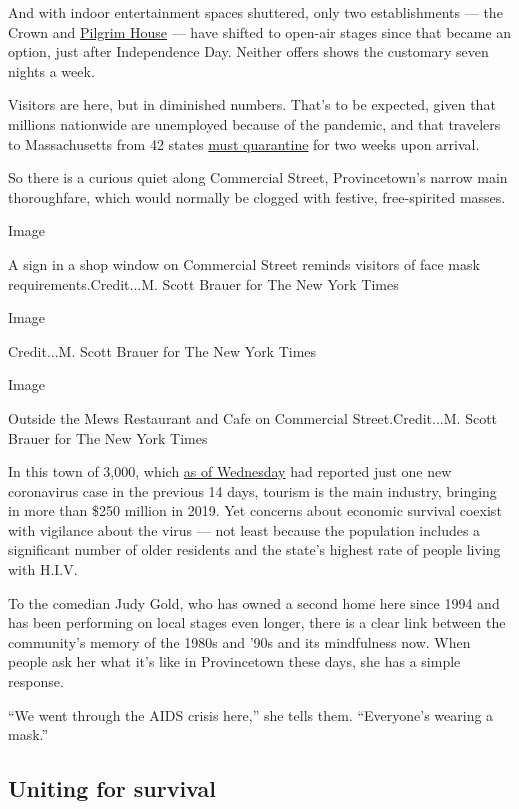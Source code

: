 And with indoor entertainment spaces shuttered, only two establishments
--- the Crown and
\href{https://www.pilgrimhouseptown.com/provincetown-entertainment/}{Pilgrim
House} --- have shifted to open-air stages since that became an option,
just after Independence Day. Neither offers shows the customary seven
nights a week.

Visitors are here, but in diminished numbers. That's to be expected,
given that millions nationwide are unemployed because of the pandemic,
and that travelers to Massachusetts from 42 states
\href{https://www.mass.gov/info-details/covid-19-travel-order\#lower-risk-states-}{must
quarantine} for two weeks upon arrival.

So there is a curious quiet along Commercial Street, Provincetown's
narrow main thoroughfare, which would normally be clogged with festive,
free-spirited masses.

Image

A sign in a shop window on Commercial Street reminds visitors of face
mask requirements.Credit...M. Scott Brauer for The New York Times

Image

Credit...M. Scott Brauer for The New York Times

Image

Outside the Mews Restaurant and Cafe on Commercial Street.Credit...M.
Scott Brauer for The New York Times

In this town of 3,000, which
\href{https://www.mass.gov/doc/weekly-covid-19-public-health-report-july-29-2020/download}{as
of Wednesday} had reported just one new coronavirus case in the previous
14 days, tourism is the main industry, bringing in more than \$250
million in 2019. Yet concerns about economic survival coexist with
vigilance about the virus --- not least because the population includes
a significant number of older residents and the state's highest rate of
people living with H.I.V.

To the comedian Judy Gold, who has owned a second home here since 1994
and has been performing on local stages even longer, there is a clear
link between the community's memory of the 1980s and '90s and its
mindfulness now. When people ask her what it's like in Provincetown
these days, she has a simple response.

``We went through the AIDS crisis here,'' she tells them. ``Everyone's
wearing a mask.''

\hypertarget{uniting-for-survival}{%
\subsection{Uniting for survival}\label{uniting-for-survival}}

